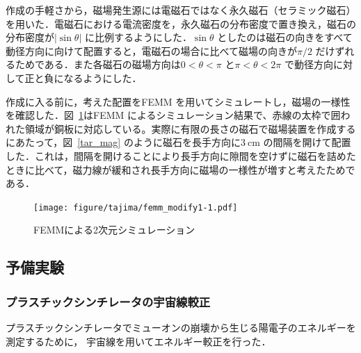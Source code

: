 作成の手軽さから，磁場発生源には電磁石ではなく永久磁石（セラミック磁石）を用いた．電磁石における電流密度を，永久磁石の分布密度で置き換え，磁石の分布密度が$|\sin\theta|$ に比例するようにした．$\sin\theta$ としたのは磁石の向きをすべて動径方向に向けて配置すると，電磁石の場合に比べて磁場の向きが$\pi/2$ だけずれるためである．また各磁石の磁場方向は$0 < \theta < \pi$ と$\pi < \theta < 2\pi$ で動径方向に対して正と負になるようにした．

作成に入る前に，考えた配置をFEMM を用いてシミュレートし，磁場の一様性を確認した．図~\ref{femm}はFEMM によるシミュレーション結果で、赤線の太枠で囲われた領域が銅板に対応している。実際に有限の長さの磁石で磁場装置を作成するにあたって，図~\ref{tar_mag} のように磁石を長手方向に$3~\mathrm{cm}$ の間隔を開けて配置した．これは，間隔を開けることにより長手方向に隙間を空けずに磁石を詰めたときに比べて，磁力線が緩和され長手方向に磁場の一様性が増すと考えたためである．

\begin{figure}[H]
\centering
\texttt{[image: figure/tajima/femm\_modify1-1.pdf]}
\caption{FEMMによる2次元シミュレーション}\label{femm}
\end{figure}


\newpage

\subsection{予備実験}

\subsubsection{プラスチックシンチレータの宇宙線較正}
プラスチックシンチレータでミューオンの崩壊から生じる陽電子のエネルギーを測定するために， 宇宙線を用いてエネルギー較正を行った．

